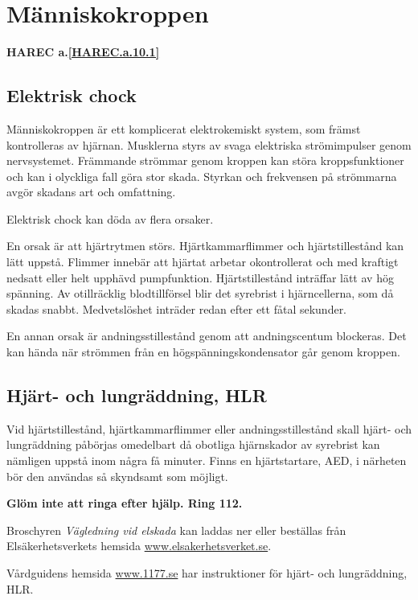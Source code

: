 \section{Människokroppen}
\textbf{
HAREC a.\ref{HAREC.a.10.1}\label{myHAREC.a.10.1}
}

\subsection{Elektrisk chock}

Människokroppen är ett komplicerat elektrokemiskt system, som främst
kontrolleras av hjärnan. Musklerna styrs av svaga elektriska
strömimpulser genom nervsystemet. Främmande strömmar genom kroppen kan
störa kroppsfunktioner och kan i olyckliga fall göra stor
skada. Styrkan och frekvensen på strömmarna avgör skadans art och
omfattning.

Elektrisk chock kan döda av flera orsaker.

En orsak är att hjärtrytmen störs. Hjärtkammarflimmer och
hjärtstillestånd kan lätt uppstå. Flimmer innebär att hjärtat arbetar
okontrollerat och med kraftigt nedsatt eller helt upphävd
pumpfunktion. Hjärtstillestånd inträffar lätt av hög spänning. Av
otillräcklig blodtillförsel blir det syrebrist i hjärncellerna, som då
skadas snabbt. Medvetslöshet inträder redan efter ett fåtal sekunder.

En annan orsak är andningsstillestånd genom att andningscentum
blockeras. Det kan hända när strömmen från en högspänningskondensator
går genom kroppen.

\subsection{Hjärt- och lungräddning, HLR}

Vid hjärtstillestånd, hjärtkammarflimmer eller andningsstillestånd skall
hjärt- och lungräddning påbörjas omedelbart då obotliga hjärnskador av
syrebrist kan nämligen uppstå inom några få minuter. Finns en hjärtstartare,
AED, i närheten bör den användas så skyndsamt som möjligt.

\textbf{Glöm inte att ringa efter hjälp. Ring 112.}

Broschyren \emph{Vägledning vid elskada} kan laddas ner eller beställas från
Elsäkerhetsverkets hemsida \url{www.elsakerhetsverket.se}.

Vårdguidens hemsida \url{www.1177.se} har instruktioner för hjärt- och lungräddning, HLR.

